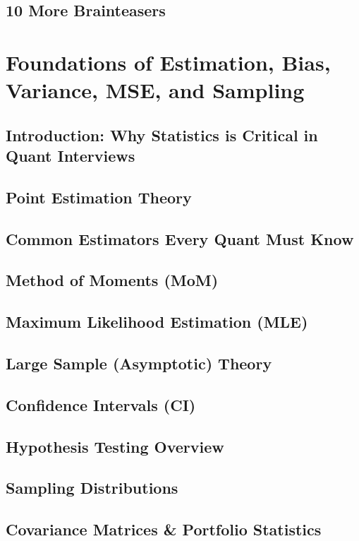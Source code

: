 \documentclass{report}
\begin{document}
\subsection*{10 More Brainteasers}



\section{Foundations of Estimation, Bias, Variance, MSE, and Sampling}
\subsection*{Introduction: Why Statistics is Critical in Quant Interviews}
\subsection*{Point Estimation Theory}
\subsection*{Common Estimators Every Quant Must Know}
\subsection*{Method of Moments (MoM)}
\subsection*{Maximum Likelihood Estimation (MLE)}
\subsection*{Large Sample (Asymptotic) Theory}
\subsection*{Confidence Intervals (CI)}
\subsection*{Hypothesis Testing Overview}
\subsection*{Sampling Distributions}
\subsection*{Covariance Matrices \& Portfolio Statistics}
\end{document}
